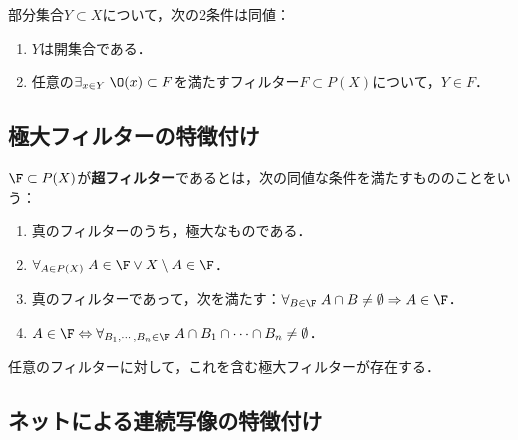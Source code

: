 \documentclass[uplatex,dvipdfmx]{jsreport}
\begin{document}
\begin{proposition}[開集合の特徴付け]
    部分集合$Y\subset X$について，次の2条件は同値：
    \begin{enumerate}
        \item $Y$は開集合である．
        \item 任意の$\exists_{x\in Y}\;\O(x)\subset F$を満たすフィルター$F\subset P(X)$について，$Y\in F$．
    \end{enumerate}
\end{proposition}

\subsection{極大フィルターの特徴付け}

\begin{theorem}
    $\F\subset P(X)$が\textbf{超フィルター}であるとは，次の同値な条件を満たすもののことをいう：
    \begin{enumerate}
        \item 真のフィルターのうち，極大なものである．
        \item $\forall_{A\in P(X)}\;A\in\F\lor X\setminus A\in\F$．
        \item 真のフィルターであって，次を満たす：$\forall_{B\in\F}\;A\cap B\ne\emptyset\Rightarrow A\in\F$．
        \item $A\in\F\Leftrightarrow\forall_{B_1,\cdots,B_n\in\F}\;A\cap B_1\cap\cdots\cap B_n\ne\emptyset$．
    \end{enumerate}
\end{theorem}

\begin{proposition}[(AC)]
    任意のフィルターに対して，これを含む極大フィルターが存在する．
\end{proposition}

\subsection{ネットによる連続写像の特徴付け}
\end{document}
